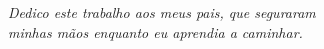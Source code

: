 
\vspace*{\fill}
\centering
\noindent
\textit{ Dedico este trabalho aos meus pais, que seguraram\\
  minhas mãos enquanto eu aprendia a caminhar.}
\vspace*{\fill}
